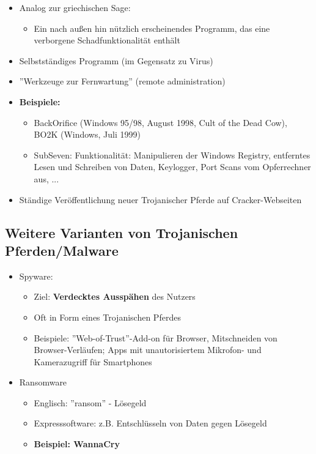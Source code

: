 \documentclass[openany]{book}
\begin{document}
\begin{itemize}
    \item Analog zur griechischen Sage:
    \begin{itemize}
        \item Ein nach außen hin nützlich erscheinendes Programm, das eine verborgene Schadfunktionalität enthält
    \end{itemize}
    \item Selbstständiges Programm (im Gegensatz zu Virus)
    \item ''Werkzeuge zur Fernwartung'' (remote administration)
    \item \textbf{Beispiele:}
    \begin{itemize}
        \item BackOrifice (Windows 95/98, August 1998, Cult of the Dead Cow), BO2K (Windows, Juli 1999)
        \item SubSeven: Funktionalität: Manipulieren der Windows Registry, entferntes Lesen und Schreiben von Daten, Keylogger, Port Scans vom Opferrechner aus, ...
    \end{itemize}
    \item Ständige Veröffentlichung neuer Trojanischer Pferde auf Cracker-Webseiten
\end{itemize}

\subsection{Weitere Varianten von Trojanischen Pferden/Malware}

\begin{itemize}
    \item Spyware:
    \begin{itemize}
        \item Ziel: \textbf{Verdecktes Ausspähen} des Nutzers
        \item Oft in Form eines Trojanischen Pferdes
        \item Beispiele: ''Web-of-Trust''-Add-on für Browser, Mitschneiden von Browser-Verläufen; Apps mit unautorisiertem Mikrofon- und Kamerazugriff für Smartphones
    \end{itemize}
    \item Ransomware
    \begin{itemize}
        \item Englisch: ''ransom'' - Lösegeld
        \item Expresssoftware: z.B. Entschlüsseln von Daten gegen Lösegeld
        \item \textbf{Beispiel: WannaCry}
    \end{itemize}
\end{itemize}
\end{document}
